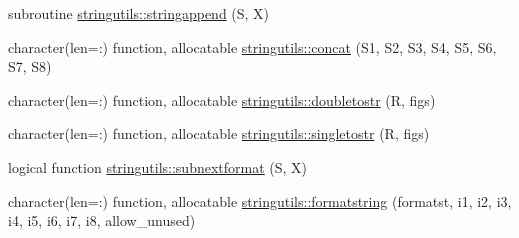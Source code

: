 \begin{DoxyCompactItemize}
subroutine \mbox{\hyperlink{namespacestringutils_a921ef80710acba9d901b45479ddae08d}{stringutils\+::stringappend}} (S, X)
\item 
character(len=\+:) function, allocatable \mbox{\hyperlink{namespacestringutils_a19e683b9de4f769c4fe0afc48a7b45d0}{stringutils\+::concat}} (S1, S2, S3, S4, S5, S6, S7, S8)
\item 
character(len=\+:) function, allocatable \mbox{\hyperlink{namespacestringutils_adb471f3dd9f3594d60675ae521b568a7}{stringutils\+::doubletostr}} (R, figs)
\item 
character(len=\+:) function, allocatable \mbox{\hyperlink{namespacestringutils_a9ee073baf898c055562e20577ad27013}{stringutils\+::singletostr}} (R, figs)
\item 
logical function \mbox{\hyperlink{namespacestringutils_a052ed985538275100bc601b4bfffde94}{stringutils\+::subnextformat}} (S, X)
\item 
character(len=\+:) function, allocatable \mbox{\hyperlink{namespacestringutils_a27d23a05ef709f393291b263dbbd78c3}{stringutils\+::formatstring}} (formatst, i1, i2, i3, i4, i5, i6, i7, i8, allow\+\_\+unused)
\end{DoxyCompactItemize}
